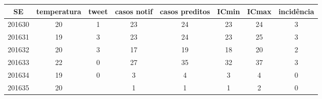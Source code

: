 \begin{tabular}{c|ccccccc}
  \hline
SE & temperatura & tweet & casos notif & casos preditos & ICmin & ICmax & incidência \\ 
  \hline
201630 & 20 & 1 & 23 & 24 & 23 & 24 & 3 \\ 
  201631 & 19 & 3 & 23 & 24 & 23 & 25 & 3 \\ 
  201632 & 20 & 3 & 17 & 19 & 18 & 20 & 2 \\ 
  201633 & 22 & 0 & 27 & 35 & 32 & 37 & 3 \\ 
  201634 & 19 & 0 & 3 & 4 & 3 & 4 & 0 \\ 
  201635 & 20 &  & 1 & 1 & 1 & 2 & 0 \\ 
   \hline
\end{tabular}
